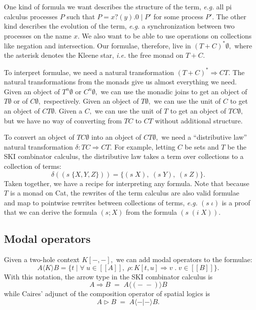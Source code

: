 \documentclass[]{acm_proc_article-sp}
\newcommand{\ldb}{[\![}
\newcommand{\rdb}{]\!]}
\newcommand{\meaningof}[1]{\ldb #1 \rdb}
\numberwithin{equation}{subsection}
\begin{document}
One kind of formula we want describes the structure of the term, {\em e.g.} all pi calculus processes $P$ such that ${P = x?(y).0\; |\; P}'$ for some process $P'.$  The other kind describes the evolution of the term, {\em e.g.} a synchronization between two processes on the name $x$.  We also want to be able to use operations on collections like negation and intersection.  Our formulae, therefore, live in $(T + C)^*\emptyset,$ where the asterisk denotes the Kleene star, {\em i.e.} the free monad on $T + C.$

To interpret formulae, we need a natural transformation $(T + C)^* \Rightarrow CT.$  The natural transformations from the monads give us almost everything we need.  Given an object of $T^n\emptyset$ or $C^n\emptyset,$ we can use the monadic joins to get an object of $T\emptyset$ or of $C\emptyset,$ respectively.  Given an object of $T\emptyset,$ we can use the unit of $C$ to get an object of $CT\emptyset.$  Given a $C,$ we can use the unit of $T$ to get an object of $TC\emptyset,$ but we have no way of converting from $TC$ to $CT$ without additional structure.

To convert an object of $TC\emptyset$ into an object of $CT\emptyset,$ we need a ``distributive law'' natural transformation $\delta\colon TC \Rightarrow CT$.  For example, letting $C$ be sets and $T$ be the SKI combinator calculus, the distributive law takes a term over collections to a collection of terms:
\[\delta ((s\; \{X, Y, Z\})) = \{(s\; X),\; (s\; Y),\; (s\; Z)\}.\]
Taken together, we have a recipe for interpreting any formula.  Note that because $T$ is a monad on Cat, the rewrites of the term calculus are also valid formulae and map to pointwise rewrites between collections of terms, {\em e.g.} $(s\; \iota)$ is a proof that we can derive the formula $(s; X)$ from the formula $(s\; (i\; X)).$

\subsection{Modal operators}

Given a two-hole context $K[-, -],$ we can add modal operators to the formulae:
\[ A \langle K\rangle B = \{ t \;|\; \forall \; u\in \meaningof{A}, \; \rho\colon K[t,u]\Rightarrow v\;.\;v \in \meaningof{B}\}.\]
With this notation, the arrow type in the SKI combinator calculus is
\[ A \Rightarrow B \;=\; A \langle (-\;-)\rangle B \]
while Caires' adjunct of the composition operator of spatial logics \cite{Caires} is
\[ A \triangleright B \;=\; A \langle -|-\rangle B.\]
\end{document}
